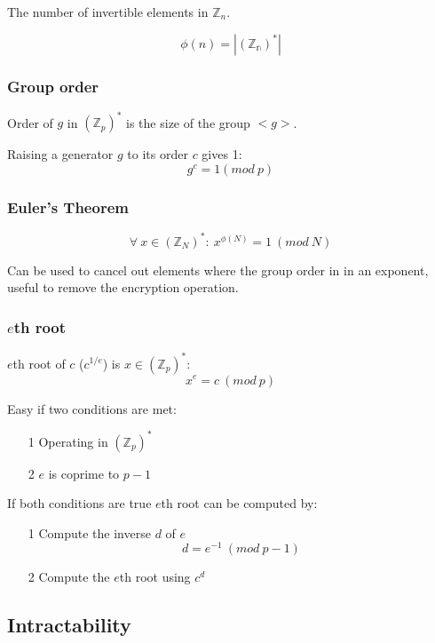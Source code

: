 \documentclass[a4paper]{article}
\begin{document}
The number of invertible elements in $\mathbb{Z}_{n}$.

\[
  \phi(n) = |(\mathbb{Z_{n}})^{*}|
\]

\subsubsection{Group order}

Order of $g$ in $(\mathbb{Z}_{p})^{*}$ is the size of the group $<g>$.

Raising a generator $g$ to its order $c$ gives 1:
\[
  g^{c} = 1 (mod \: p)
\]

\subsubsection{Euler's Theorem}

\[
  \forall \: x \in (\mathbb{Z}_{N})^{*}: \: x^{\phi(N)} = 1 \: (mod \: N)
\]

Can be used to cancel out elements where the group order in in an exponent,
useful to remove the encryption operation.

\subsubsection{$e$th root}

$e$th root of $c$ ($c^{1/e}$) is $x \in (\mathbb{Z}_{p})^{*}$:
\[
  x^{e} = c \: (mod \: p)
\]


Easy if two conditions are met:
\begin{enumerate}
  \item[1] Operating in $(\mathbb{Z}_{p})^{*}$
  \item[2] $e$ is coprime to $p-1$
\end{enumerate}

If both conditions are true $e$th root can be computed by:
\begin{enumerate}
  \item[1]
    Compute the inverse $d$ of $e$ \\
    \[
      d = e^{-1} \: (mod \: p - 1)
    \]

  \item[2]
    Compute the $e$th root using $c^{d}$

\end{enumerate}

\subsection{Intractability}
\end{document}
